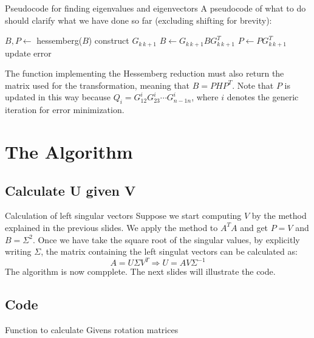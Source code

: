\documentclass[10pt]{beamer}
\begin{document}
\begin{frame}{Pseudocode for finding eigenvalues and eigenvectors}
    A pseudocode of what to do should clarify what we have done so far (excluding shifting for brevity):
    \begin{algorithmic}
        \State $B, P \gets $ hessemberg($ B $)
                \State construct $G_{k \, k+1}$
                \State $B \gets G_{k \, k+1} B G_{k \, k+1}^T$
                \State $P \gets P G_{k \, k+1}^T$
            \EndFor
            \State update error
        \EndWhile
    \end{algorithmic}
    The function implementing the Hessemberg reduction must also return the matrix used for the transformation, meaning that $B = P H P^T$. \newline
    Note that $P$ is updated in this way because $Q_i = G_{12}^i G_{23}^i \cdots G_{n-1 n}^i$, where $i$ denotes the generic iteration for error minimization.
\end{frame}

\section{The Algorithm}

\subsection{Calculate U given V}

\begin{frame}{Calculation of left singular vectors}
    Suppose we start computing $V$ by the method explained in the previous slides. \newline
    We apply the method to $A^T A$ and get $P = V$ and $B = \Sigma^2$. \newline
    Once we have take the square root of the singular values, by explicitly writing $\Sigma$, the matrix containing the left singulat vectors can be calculated as:
    $$
    A = U \Sigma V^T \Rightarrow U = A V \Sigma^{-1}
    $$
    The algorithm is now compplete. The next slides will illustrate the code.
\end{frame}

\subsection{Code}

\begin{frame}[fragile]{Function to calculate Givens rotation matrices}
    
\end{frame}
\end{document}
